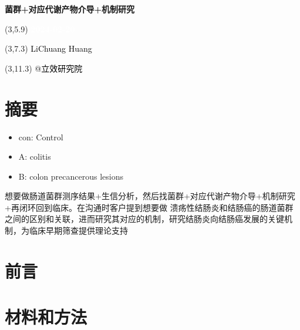 \documentclass[
]{article}
\author{}
\date{\vspace{-2.5em}}
\providecommand{\tightlist}{%
  \setlength{\itemsep}{0pt}\setlength{\parskip}{0pt}}
\begin{document}
\begin{titlepage} 
\begin{center} \textbf{\Huge
菌群+对应代谢产物介导+机制研究} \vspace{4em}
\begin{textblock}{10}(3,5.9) \huge
\textbf{\textcolor{white}{2024-02-20}}
\end{textblock} \begin{textblock}{10}(3,7.3)
\Large \textcolor{black}{LiChuang Huang}
\end{textblock} \begin{textblock}{10}(3,11.3)
\Large \textcolor{black}{@立效研究院}
\end{textblock} \end{center} \end{titlepage}
\restoregeometry


\tableofcontents

\listoffigures

\listoftables

\newpage


\hypertarget{abstract}{%
\section{摘要}\label{abstract}}

\begin{itemize}
\tightlist
\item
  con: Control
\item
  A: colitis
\item
  B: colon precancerous lesions
\end{itemize}

想要做肠道菌群测序结果+生信分析，然后找菌群+对应代谢产物介导+机制研究+再闭环回到临床。在沟通时客户提到想要做
溃疡性结肠炎和结肠癌的肠道菌群之间的区别和关联，进而研究其对应的机制，研究结肠炎向结肠癌发展的关键机制，为临床早期筛查提供理论支持

\hypertarget{introduction}{%
\section{前言}\label{introduction}}

\hypertarget{methods}{%
\section{材料和方法}\label{methods}}
\end{document}
